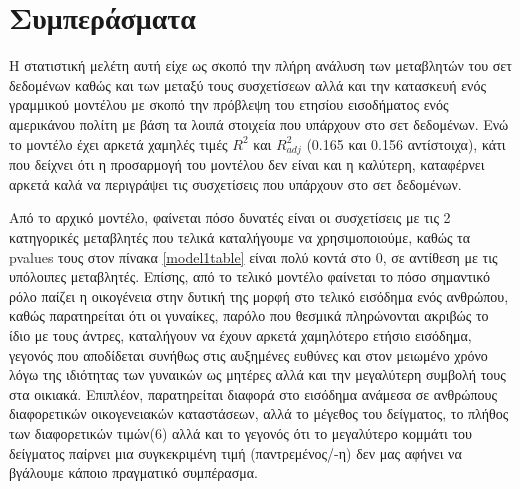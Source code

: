 \documentclass[10pt, letterpaper]{article}
\begin{document}
    \section{Συμπεράσματα}

    \par Η στατιστική μελέτη αυτή είχε ως σκοπό την πλήρη ανάλυση των μεταβλητών του σετ δεδομένων καθώς και των μεταξύ τους συσχετίσεων αλλά και την κατασκευή ενός γραμμικού μοντέλου με σκοπό την πρόβλεψη του ετησίου εισοδήματος ενός αμερικάνου πολίτη με βάση τα λοιπά στοιχεία που υπάρχουν στο σετ δεδομένων. Ενώ το μοντέλο έχει αρκετά χαμηλές τιμές $R^2$ και $R^2_{adj}$ (0.165 και 0.156 αντίστοιχα), κάτι που δείχνει ότι η προσαρμογή του μοντέλου δεν είναι και η καλύτερη, καταφέρνει αρκετά καλά να περιγράψει τις συσχετίσεις που υπάρχουν στο σετ δεδομένων.

    \par Από το αρχικό μοντέλο, φαίνεται πόσο δυνατές είναι οι συσχετίσεις με τις 2 κατηγορικές μεταβλητές που τελικά καταλήγουμε να χρησιμοποιούμε, καθώς τα pvalues τους στον πίνακα \ref{model1table} είναι πολύ κοντά στο 0, σε αντίθεση με τις υπόλοιπες μεταβλητές. Επίσης, από το τελικό μοντέλο φαίνεται το πόσο σημαντικό ρόλο παίζει η οικογένεια στην δυτική της μορφή στο τελικό εισόδημα ενός ανθρώπου, καθώς παρατηρείται ότι οι γυναίκες, παρόλο που θεσμικά πληρώνονται ακριβώς το ίδιο με τους άντρες, καταλήγουν να έχουν αρκετά χαμηλότερο ετήσιο εισόδημα, γεγονός που αποδίδεται συνήθως στις αυξημένες ευθύνες και στον μειωμένο χρόνο λόγω της ιδιότητας των γυναικών ως μητέρες αλλά και την μεγαλύτερη συμβολή τους στα οικιακά. Επιπλέον, παρατηρείται διαφορά στο εισόδημα ανάμεσα σε ανθρώπους διαφορετικών οικογενειακών καταστάσεων, αλλά το μέγεθος του δείγματος, το πλήθος των διαφορετικών τιμών(6) αλλά και το γεγονός ότι το μεγαλύτερο κομμάτι του δείγματος παίρνει μια συγκεκριμένη τιμή (παντρεμένος/-η) δεν μας αφήνει να βγάλουμε κάποιο πραγματικό συμπέρασμα.

    \newpage
\end{document}
